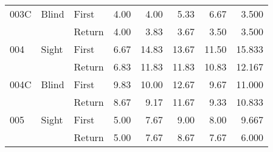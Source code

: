 \begin{table}[!htb]
\begin{tabular}{lllrrrrr}
003C & Blind & First &  4.00 &   4.00 &                                                  5.33 &                                                   6.67 &   3.500 \\
    &       & Return &  4.00 &   3.83 &                                                  3.67 &                                                   3.50 &   3.500 \\
004 & Sight & First &  6.67 &  14.83 &                                                 13.67 &                                                  11.50 &  15.833 \\
    &       & Return &  6.83 &  11.83 &                                                 11.83 &                                                  10.83 &  12.167 \\
004C & Blind & First &  9.83 &  10.00 &                                                 12.67 &                                                   9.67 &  11.000 \\
    &       & Return &  8.67 &   9.17 &                                                 11.67 &                                                   9.33 &  10.833 \\
005 & Sight & First &  5.00 &   7.67 &                                                  9.00 &                                                   8.00 &   9.667 \\
    &       & Return &  5.00 &   7.67 &                                                  8.67 &                                                   7.67 &   6.000 \\
\bottomrule
\end{tabular}
\end{table}

